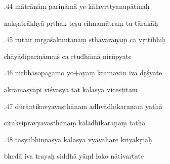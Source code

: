 \documentclass[article,12pt,a4paper]{memoir}%
\newcounter{parCount}
\begin{document}
	  
	  \pstart {}.44 mātrāṇāṃ pariṇāmā ye kālavṛttyanupātinaḥ 
	{}
	\pend%
      

	  
	  \pstart \leavevmode%
	nakṣatrākhyā pṛthak teṣu cihnamātraṃ tu tārakāḥ 
	{}
	\pend%
      

	  
	  \pstart {}.45 rutair mṛgaśakuntānāṃ sthāvarāṇāṃ ca vṛttibhiḥ 
	{}
	\pend%
      

	  
	  \pstart \leavevmode%
	chāyādipariṇāmaiś ca ṛtudhāmā nirūpyate 
	{}
	\pend%
      

	  
	  \pstart {}.46 nirbhāsopagamo yo+ayaṃ kramavān iva dṛśyate 
	{}
	\pend%
      

	  
	  \pstart \leavevmode%
	akramasyāpi viśvasya tat kālasya viceṣṭitam 
	{}
	\pend%
      

	  
	  \pstart {}.47 dūrāntikavyavasthānam adhvādhikaraṇaṃ yathā 
	{}
	\pend%
      

	  
	  \pstart \leavevmode%
	cirakṣipravyavasthānaṃ kālādhikaraṇaṃ tathā 
	{}
	\pend%
      

	  
	  \pstart {}.48 tasyābhinnasya kālasya vyavahāre kriyākṛtāḥ 
	{}
	\pend%
      

	  
	  \pstart \leavevmode%
	bhedā iva trayaḥ siddhā yāṃl loko nātivartate 
	{}
	\pend%
      
\end{document}
